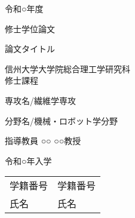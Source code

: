 \documentclass[main]{subfiles}
\begin{document}
\begin{titlepage}
    \fontsize{30pt}{30pt} \selectfont

    \centering
    令和○年度
    \vspace{15pt}

    修士学位論文
    \vspace{45pt}

    論文タイトル
    \vspace{45pt}

    信州大学大学院総合理工学研究科 \\
    修士課程
    \vspace{20pt}

    専攻名/繊維学専攻
    \vspace{20pt}

    分野名/機械・ロボット学分野
    \vspace{45pt}

    指導教員 ○○ ○○教授
    \vspace{45pt}

    令和○年入学
    \vspace{15pt}

    \begin{tabular}{ll}
        学籍番号 & 学籍番号 \\
        氏名   & 氏名   \\
    \end{tabular}
    \normalsize

\end{titlepage}
\end{document}
